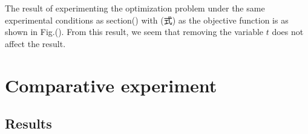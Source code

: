 \documentclass[fp,twocolumn]{jpsj3}
\begin{document}
The result of experimenting the optimization problem under the same experimental conditions as section() with (式) as the objective function is as shown in Fig.(). From this result, we seem that removing the variable $t$ does not affect the result. 

\section{Comparative experiment} %
\subsection{Results} %

\begin{acknowledgment}



\end{acknowledgment}



\begin{thebibliography}{1}
\end{thebibliography}
\end{document}
